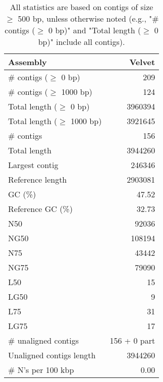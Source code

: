 \documentclass[12pt,a4paper]{article}
\begin{document}
\begin{table}[ht]
\begin{center}
\caption{All statistics are based on contigs of size $\geq$ 500 bp, unless otherwise noted (e.g., "\# contigs ($\geq$ 0 bp)" and "Total length ($\geq$ 0 bp)" include all contigs).}
\begin{tabular}{|l*{1}{|r}|}
\hline
Assembly & Velvet \\ \hline
\# contigs ($\geq$ 0 bp) & 209 \\ \hline
\# contigs ($\geq$ 1000 bp) & 124 \\ \hline
Total length ($\geq$ 0 bp) & 3960394 \\ \hline
Total length ($\geq$ 1000 bp) & 3921645 \\ \hline
\# contigs & 156 \\ \hline
Total length & 3944260 \\ \hline
Largest contig & 246346 \\ \hline
Reference length & 2903081 \\ \hline
GC (\%) & 47.52 \\ \hline
Reference GC (\%) & 32.73 \\ \hline
N50 & 92036 \\ \hline
NG50 & 108194 \\ \hline
N75 & 43442 \\ \hline
NG75 & 79090 \\ \hline
L50 & 15 \\ \hline
LG50 & 9 \\ \hline
L75 & 31 \\ \hline
LG75 & 17 \\ \hline
\# unaligned contigs & 156 + 0 part \\ \hline
Unaligned contigs length & 3944260 \\ \hline
\# N's per 100 kbp & 0.00 \\ \hline
\end{tabular}
\end{center}
\end{table}
\end{document}
